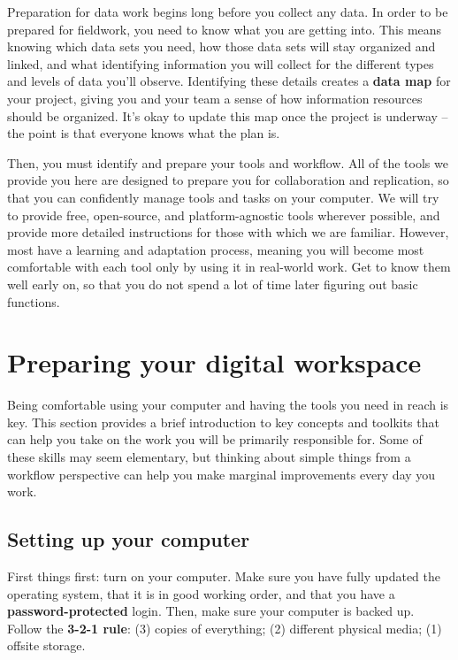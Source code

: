 
\begin{fullwidth}
Preparation for data work begins long before you collect any data.
In order to be prepared for fieldwork, you need to know what you are getting into.
This means knowing which data sets you need,
how those data sets will stay organized and linked,
and what identifying information you will collect
for the different types and levels of data you'll observe.
Identifying these details creates a \textbf{data map} for your project,
giving you and your team a sense of how information resources should be organized.
It's okay to update this map once the project is underway --
the point is that everyone knows what the plan is.

Then, you must identify and prepare your tools and workflow.
All of the tools we provide you here are designed to prepare you for collaboration and replication,
so that you can confidently manage tools and tasks on your computer.
We will try to provide free, open-source, and platform-agnostic tools wherever possible,
and provide more detailed instructions for those with which we are familiar.
However, most have a learning and adaptation process,
meaning you will become most comfortable with each tool
only by using it in real-world work.
Get to know them well early on,
so that you do not spend a lot of time later figuring out basic functions.
\end{fullwidth}



\section{Preparing your digital workspace}

Being comfortable using your computer and having the tools you need in reach is key.
This section provides a brief introduction to key concepts and toolkits
that can help you take on the work you will be primarily responsible for.
Some of these skills may seem elementary,
but thinking about simple things from a workflow perspective
can help you make marginal improvements every day you work.

\subsection{Setting up your computer}

First things first: turn on your computer.
Make sure you have fully updated the operating system,
that it is in good working order,
and that you have a \textbf{password-protected} login.
Then, make sure your computer is backed up.
Follow the \textbf{3-2-1 rule}:
(3) copies of everything;
(2) different physical media;
(1) offsite storage.

